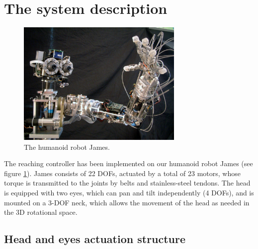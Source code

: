 \section{The system description}

\begin{figure}[h!tbp]
\centering
\includegraphics[width=80mm]{Figure/James1.png}
\caption{The humanoid robot James.}
\label{Fig:PicureJames}
\end{figure}

The reaching controller has been implemented on our humanoid robot James (see figure \ref{Fig:PicureJames}). James consists of 22 DOFs, actuated by a total of 23 motors, whose torque is transmitted to the joints by belts and stainless-steel tendons. The head is equipped with two eyes, which can pan and tilt independently (4 DOFs), and is mounted on a 3-DOF neck, which allows the movement of the head as needed in the 3D rotational space.


\subsection{Head and eyes actuation structure} \label{Sec:HeadEyesStructure}

